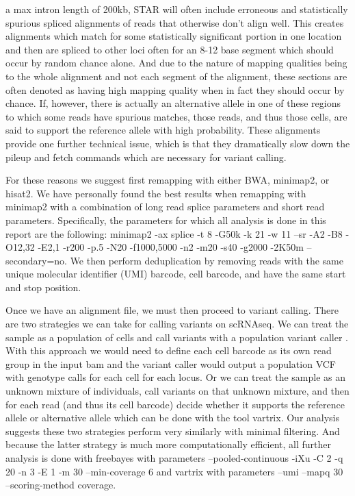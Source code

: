 a max intron length of 200kb, STAR will often include erroneous and statistically spurious spliced alignments of reads that otherwise don't align well. This creates alignments 
which match for some statistically significant portion in one location and then are spliced to other loci often for an 8-12 base segment which should occur by 
random chance alone. And due to the nature of mapping qualities being to the whole alignment and not each segment of the alignment, these sections are often denoted as 
having high mapping quality when in fact they should occur by chance. If, however, there is actually an alternative allele in one of these regions to which some reads have 
spurious matches, those reads, and thus those cells, are said to support the reference allele with high probability. These alignments provide one further technical 
issue, which is that they dramatically slow down the pileup and fetch commands which are necessary for variant calling. 

For these reasons we suggest first remapping with either BWA, minimap2, or hisat2. We have personally found the best results when remapping with minimap2 with a combination 
of long read splice parameters and short read parameters. Specifically, the parameters for which all analysis is done in this report are the following: 
minimap2 -ax splice -t 8 -G50k -k 21 -w 11 --sr -A2 -B8 -O12,32 -E2,1 -r200 -p.5 -N20 -f1000,5000 -n2 -m20 -s40 -g2000 -2K50m --secondary=no. We then perform 
deduplication by removing reads with the same unique molecular identifier (UMI) barcode, cell barcode, and have the same start and stop position.

Once we have an alignment file, we must then proceed to variant calling. There are two strategies we can take for calling variants on scRNAseq. We can treat 
the sample as a population of cells and call variants with a population variant caller \cite{freebayes} \cite{gatk} \cite{samtools}. With this approach we would need 
to define each cell barcode as its own read group in the input bam and the variant caller would output a population VCF with genotype calls for each cell for each locus.
Or we can treat the sample as an unknown mixture of individuals, call variants on that unknown mixture, and then for each read (and thus its cell barcode) 
decide whether it supports the reference allele or alternative 
allele which can be done with the tool vartrix\cite{vartrix}. Our analysis suggests these two strategies perform very similarly with minimal filtering. And because 
the latter strategy is much more computationally efficient, all further analysis is done with freebayes with parameters --pooled-continuous -iXu -C 2 -q 20 -n 3 -E 1 -m 30 --min-coverage 6 and vartrix with parameters  --umi --mapq 30 --scoring-method coverage.
